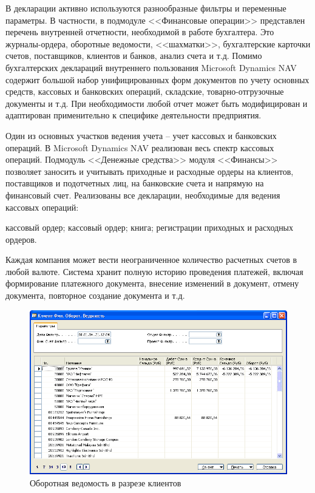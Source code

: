 \documentclass[14pt,a4paper]{reportmod}
\begin{document}
В декларации активно используются разнообразные фильтры и переменные параметры. В частности, в подмодуле <<Финансовые операции>> представлен перечень внутренней отчетности, необходимой в работе бухгалтера. Это журналы-ордера, оборотные ведомости, <<шахматки>>, бухгалтерские карточки счетов, поставщиков, клиентов и банков, анализ счета и т.д. Помимо бухгалтерских деклараций внутреннего пользования Microsoft Dynamics NAV содержит большой набор унифицированных форм документов по учету основных средств, кассовых и банковских операций, складские, товарно-отгрузочные документы и т.д. При необходимости любой отчет может быть модифицирован и адаптирован применительно к специфике деятельности предприятия.


Один из основных участков ведения учета – учет кассовых и банковских операций. В Microsoft Dynamics NAV реализован весь спектр кассовых операций. Подмодуль <<Денежные средства>> модуля <<Финансы>> позволяет заносить и учитывать приходные и расходные ордеры на клиентов, поставщиков и подотчетных лиц, на банковские счета и напрямую на финансовый счет. Реализованы все декларации, необходимые для ведения кассовых операций:
\begin{itemize}
   кассовый ордер;
   кассовый ордер;
   книга;
   регистрации приходных и расходных ордеров.
\end{itemize}
Каждая компания может вести неограниченное количество расчетных счетов в любой валюте. Система хранит полную историю проведения платежей, включая формирование платежного документа, внесение изменений в документ, отмену документа, повторное создание документа и т.д.
\begin{figure}
  \centering
  \includegraphics[scale=0.50]{pics/navision_img1}
  \caption{Оборотная ведомость в разрезе клиентов}
  \label{pic:navision_pic1}
\end{figure}
\end{document}
